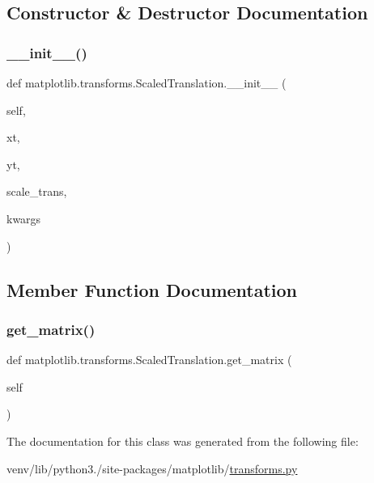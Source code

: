\subsection{Constructor \& Destructor Documentation}
\mbox{\label{classmatplotlib_1_1transforms_1_1ScaledTranslation_a3477e23ba4b8fd47444c8f94dca035ba}} 
\subsubsection{\texorpdfstring{\+\_\+\+\_\+init\+\_\+\+\_\+()}{\_\_init\_\_()}}
{\footnotesize\ttfamily def matplotlib.\+transforms.\+Scaled\+Translation.\+\_\+\+\_\+init\+\_\+\+\_\+ (\begin{DoxyParamCaption}\item[{}]{self,  }\item[{}]{xt,  }\item[{}]{yt,  }\item[{}]{scale\+\_\+trans,  }\item[{}]{kwargs }\end{DoxyParamCaption})}



\subsection{Member Function Documentation}
\mbox{\label{classmatplotlib_1_1transforms_1_1ScaledTranslation_ab5725291f1ed39d40bdd2c414ca01bf7}} 
\subsubsection{\texorpdfstring{get\+\_\+matrix()}{get\_matrix()}}
{\footnotesize\ttfamily def matplotlib.\+transforms.\+Scaled\+Translation.\+get\+\_\+matrix (\begin{DoxyParamCaption}\item[{}]{self }\end{DoxyParamCaption})}



The documentation for this class was generated from the following file\+:\begin{DoxyCompactItemize}
\item 
venv/lib/python3./site-\/packages/matplotlib/\hyperlink{transforms_8py}{transforms.\+py}\end{DoxyCompactItemize}
